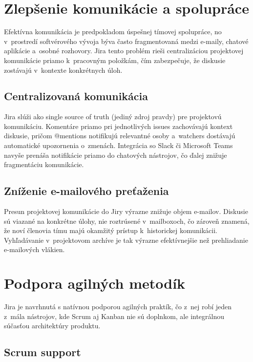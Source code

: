 \section{Zlepšenie komunikácie a spolupráce}

Efektívna komunikácia je predpokladom úspešnej tímovej spolupráce, no v~prostredí softvérového vývoja býva často fragmentovaná medzi e-maily, chatové aplikácie a~osobné rozhovory. Jira tento problém rieši centralizáciou projektovej komunikácie priamo k~pracovným položkám, čím zabezpečuje, že diskusie zostávajú v~kontexte konkrétnych úloh.

\subsection{Centralizovaná komunikácia}

Jira slúži ako single source of truth (jediný zdroj pravdy) pre projektovú komunikáciu. Komentáre priamo pri jednotlivých issues zachovávajú kontext diskusie, pričom @mentions notifikujú relevantné osoby a~watchers dostávajú automatické upozornenia o~zmenách. Integrácia so Slack či Microsoft Teams navyše prenáša notifikácie priamo do chatových nástrojov, čo ďalej znižuje fragmentáciu komunikácie.

\subsection{Zníženie e-mailového preťaženia}

Presun projektovej komunikácie do Jiry výrazne znižuje objem e-mailov. Diskusie sú viazané na konkrétne úlohy, nie roztrúsené v~mailboxoch, čo zároveň znamená, že noví členovia tímu majú okamžitý prístup k~historickej komunikácii. Vyhľadávanie v~projektovom archíve je tak výrazne efektívnejšie než prehliadanie e-mailových vlákien.

\section{Podpora agilných metodík}

Jira je navrhnutá s natívnou podporou agilných praktík, čo z~nej robí jeden z~mála nástrojov, kde Scrum aj Kanban nie sú doplnkom, ale integrálnou súčasťou architektúry produktu.

\subsection{Scrum support}

